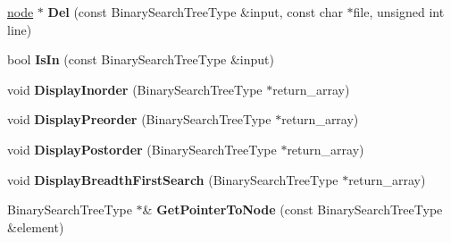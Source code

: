 \begin{DoxyCompactItemize}
\item 
\hypertarget{class_data_structures_1_1_binary_search_tree_a9a29693e4575fc0fe18ab778a75c89b8}{\hyperlink{struct_data_structures_1_1_binary_search_tree_1_1node}{node} $\ast$ {\bfseries Del} (const Binary\-Search\-Tree\-Type \&input, const char $\ast$file, unsigned int line)}\label{class_data_structures_1_1_binary_search_tree_a9a29693e4575fc0fe18ab778a75c89b8}

\item 
\hypertarget{class_data_structures_1_1_binary_search_tree_adca1aa14d6bdeec90248567b05e4c28f}{bool {\bfseries Is\-In} (const Binary\-Search\-Tree\-Type \&input)}\label{class_data_structures_1_1_binary_search_tree_adca1aa14d6bdeec90248567b05e4c28f}

\item 
\hypertarget{class_data_structures_1_1_binary_search_tree_a66f82a3176d81b0ef3d1a8362d9e1507}{void {\bfseries Display\-Inorder} (Binary\-Search\-Tree\-Type $\ast$return\-\_\-array)}\label{class_data_structures_1_1_binary_search_tree_a66f82a3176d81b0ef3d1a8362d9e1507}

\item 
\hypertarget{class_data_structures_1_1_binary_search_tree_a4b2048b47d3a209de79a185ca29c65e4}{void {\bfseries Display\-Preorder} (Binary\-Search\-Tree\-Type $\ast$return\-\_\-array)}\label{class_data_structures_1_1_binary_search_tree_a4b2048b47d3a209de79a185ca29c65e4}

\item 
\hypertarget{class_data_structures_1_1_binary_search_tree_a03b31b8c324d813560205b2806775f46}{void {\bfseries Display\-Postorder} (Binary\-Search\-Tree\-Type $\ast$return\-\_\-array)}\label{class_data_structures_1_1_binary_search_tree_a03b31b8c324d813560205b2806775f46}

\item 
\hypertarget{class_data_structures_1_1_binary_search_tree_a718b886877feb30466efba30341c0a82}{void {\bfseries Display\-Breadth\-First\-Search} (Binary\-Search\-Tree\-Type $\ast$return\-\_\-array)}\label{class_data_structures_1_1_binary_search_tree_a718b886877feb30466efba30341c0a82}

\item 
\hypertarget{class_data_structures_1_1_binary_search_tree_ac7878327f9c37d8b7d63d6f98bb9b35e}{Binary\-Search\-Tree\-Type $\ast$\& {\bfseries Get\-Pointer\-To\-Node} (const Binary\-Search\-Tree\-Type \&element)}\label{class_data_structures_1_1_binary_search_tree_ac7878327f9c37d8b7d63d6f98bb9b35e}

\end{DoxyCompactItemize}
